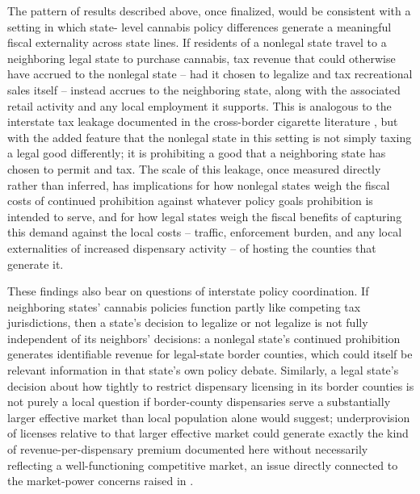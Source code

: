 \documentclass[12pt]{article}
\begin{document}
The pattern of results described above, once finalized, would be consistent with a setting in which state-
level cannabis policy differences generate a meaningful fiscal externality across state lines. If residents
of a nonlegal state travel to a neighboring legal state to purchase cannabis, tax revenue that could
otherwise have accrued to the nonlegal state -- had it chosen to legalize and tax recreational sales itself
-- instead accrues to the neighboring state, along with the associated retail activity and any local
employment it supports. This is analogous to the interstate tax leakage documented in the cross-border
cigarette literature \citep{Lovenheim2008}, but with the added feature that the nonlegal state in this
setting is not simply taxing a legal good differently; it is prohibiting a good that a neighboring state has
chosen to permit and tax. The scale of this leakage, once measured directly rather than inferred, has
implications for how nonlegal states weigh the fiscal costs of continued prohibition against whatever
policy goals prohibition is intended to serve, and for how legal states weigh the fiscal benefits of
capturing this demand against the local costs -- traffic, enforcement burden, and any local externalities of
increased dispensary activity -- of hosting the counties that generate it.

These findings also bear on questions of interstate policy coordination. If neighboring states' cannabis
policies function partly like competing tax jurisdictions, then a state's decision to legalize or not
legalize is not fully independent of its neighbors' decisions: a nonlegal state's continued prohibition
generates identifiable revenue for legal-state border counties, which could itself be relevant information
in that state's own policy debate. Similarly, a legal state's decision about how tightly to restrict
dispensary licensing in its border counties is not purely a local question if border-county dispensaries
serve a substantially larger effective market than local population alone would suggest; underprovision of
licenses relative to that larger effective market could generate exactly the kind of revenue-per-dispensary
premium documented here without necessarily reflecting a well-functioning competitive market, an issue
directly connected to the market-power concerns raised in \citet{HollenbeckUetake2021}.
\end{document}
